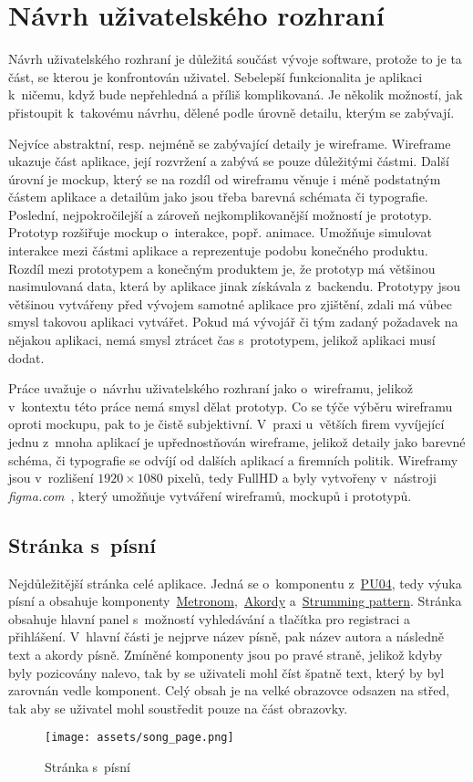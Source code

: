 \section{Návrh uživatelského rozhraní}
\label{sc:wireframes}
Návrh uživatelského rozhraní je důležitá součást vývoje software, protože to je ta část, se kterou je konfrontován uživatel. Sebelepší funkcionalita je aplikaci k~ničemu, když bude nepřehledná a příliš komplikovaná. Je několik možností, jak přistoupit k~takovému návrhu, dělené podle úrovně detailu, kterým se zabývají.

Nejvíce abstraktní, resp. nejméně se zabývající detaily je wireframe. Wireframe ukazuje část aplikace, její rozvržení a zabývá se pouze důležitými částmi. Další úrovní je mockup, který se na rozdíl od wireframu věnuje i méně podstatným částem aplikace a detailům jako jsou třeba barevná schémata či typografie. Poslední, nejpokročilejší a zároveň nejkomplikovanější možností je prototyp. Prototyp rozšiřuje mockup o~interakce, popř. animace. Umožňuje simulovat interakce mezi částmi aplikace a reprezentuje podobu konečného produktu. Rozdíl mezi prototypem a konečným produktem je, že prototyp má většinou nasimulovaná data, která by aplikace jinak získávala z~backendu. Prototypy jsou většinou vytvářeny před vývojem samotné aplikace pro zjištění, zdali má vůbec smysl takovou aplikaci vytvářet. Pokud má vývojář či tým zadaný požadavek na nějakou aplikaci, nemá smysl ztrácet čas s~prototypem, jelikož aplikaci musí dodat.

Práce uvažuje o~návrhu uživatelského rozhraní jako o~wireframu, jelikož v~kontextu této práce nemá smysl dělat prototyp. Co se týče výběru wireframu oproti mockupu, pak to je čistě subjektivní. V~praxi u~větších firem vyvíjející jednu z~mnoha aplikací je upřednostňován wireframe, jelikož detaily jako barevné schéma, či typografie se odvíjí od dalších aplikací a firemních politik. Wireframy jsou v~rozlišení $1920 \times 1080$ pixelů, tedy FullHD a byly vytvořeny v~nástroji \emph{figma.com}~\cite{figmainc_2019_figma}, který umožňuje vytváření wireframů, mockupů i prototypů.

\subsection{Stránka s~písní}
\label{ss:wireframe_song}
Nejdůležitější stránka celé aplikace. Jedná se o~komponentu z~\hyperref[uc04]{PU04}, tedy výuka písní a obsahuje komponenty~\hyperref[uc01]{Metronom},~\hyperref[uc02]{Akordy} a~\hyperref[uc03]{Strumming pattern}. Stránka obsahuje hlavní panel s~možností vyhledávání a tlačítka pro registraci a přihlášení. V~hlavní části je nejprve název písně, pak název autora a následně text a akordy písně. Zmíněné komponenty jsou po pravé straně, jelikož kdyby byly pozicovány nalevo, tak by se uživateli mohl číst špatně text, který by byl zarovnán vedle komponent. Celý obsah je na velké obrazovce odsazen na střed, tak aby se uživatel mohl soustředit pouze na část obrazovky.

\begin{figure}[h!]
    \centering
    \texttt{[image: assets/song\_page.png]}
    \caption{Stránka s~písní}
    \label{fig:song_page}
\end{figure}